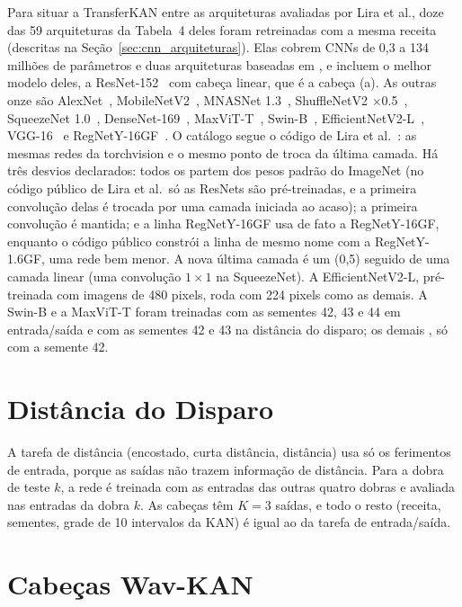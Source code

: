 Para situar a TransferKAN entre as arquiteturas avaliadas por Lira et al., doze das 59 arquiteturas da Tabela~4 deles foram retreinadas com a mesma receita (descritas na Seção~\ref{sec:cnn_arquiteturas}). Elas cobrem \glspl{CNN} de 0,3 a 134 milhões de parâmetros e duas arquiteturas baseadas em , e incluem o melhor modelo deles, a ResNet-152~\cite{he2016resnet} com cabeça linear, que é a cabeça (a). As outras onze são AlexNet~\cite{krizhevsky2012alexnet}, MobileNetV2~\cite{sandler2018mobilenetv2}, MNASNet 1.3~\cite{tan2019mnasnet}, ShuffleNetV2 $\times$0.5~\cite{ma2018shufflenetv2}, SqueezeNet 1.0~\cite{iandola2016squeezenet}, DenseNet-169~\cite{huang2017densenet}, MaxViT-T~\cite{tu2022maxvit}, Swin-B~\cite{liu2021swin}, EfficientNetV2-L~\cite{tan2021efficientnetv2}, VGG-16~\cite{simonyan2015vgg} e RegNetY-16GF~\cite{radosavovic2020regnet}. O catálogo segue o código de Lira et al.~\cite{leguwoi}: as mesmas redes da torchvision e o mesmo ponto de troca da última camada. Há três desvios declarados: todos os  partem dos pesos padrão do ImageNet (no código público de Lira et al.\ só as ResNets são pré-treinadas, e a primeira convolução delas é trocada por uma camada iniciada ao acaso); a primeira convolução é mantida; e a linha RegNetY-16GF usa de fato a RegNetY-16GF, enquanto o código público constrói a linha de mesmo nome com a RegNetY-1.6GF, uma rede bem menor. A nova última camada é um  (0,5) seguido de uma camada linear (uma convolução $1 \times 1$ na SqueezeNet). A EfficientNetV2-L, pré-treinada com imagens de 480 pixels, roda com 224 pixels como as demais. A Swin-B e a MaxViT-T foram treinadas com as sementes 42, 43 e 44 em entrada/saída e com as sementes 42 e 43 na distância do disparo; os demais , só com a semente 42.

\section{Distância do Disparo}
\label{sec:mlsd_setup}

A tarefa de distância (encostado, curta distância, distância) usa só os ferimentos de entrada, porque as saídas não trazem informação de distância. Para a dobra de teste $k$, a rede é treinada com as entradas das outras quatro dobras e avaliada nas entradas da dobra $k$. As cabeças têm $K=3$ saídas, e todo o resto (receita, sementes, grade de 10 intervalos da KAN) é igual ao da tarefa de entrada/saída.

\section{Cabeças Wav-KAN}
\label{sec:wavkan_setup}

